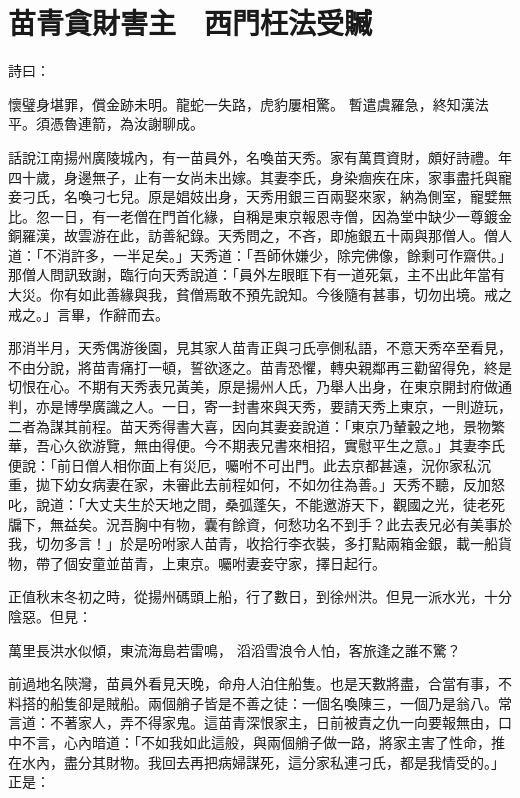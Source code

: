 %

\chapter{苗青貪財害主　西門枉法受贓}

詩曰：

懷璧身堪罪，償金跡未明。龍蛇一失路，虎豹屢相驚。
暫遣虞羅急，終知漢法平。須憑魯連箭，為汝謝聊成。

話說江南揚州廣陵城內，有一苗員外，名喚苗天秀。家有萬貫資財，頗好詩禮。年四十歲，身邊無子，止有一女尚未出嫁。其妻李氏，身染痼疾在床，家事盡托與寵妾刁氏，名喚刁七兒。原是娼妓出身，天秀用銀三百兩娶來家，納為側室，寵嬖無比。忽一日，有一老僧在門首化緣，自稱是東京報恩寺僧，因為堂中缺少一尊鍍金銅羅漢，故雲游在此，訪善紀錄。天秀問之，不吝，即施銀五十兩與那僧人。僧人道：「不消許多，一半足矣。」天秀道：「吾師休嫌少，除完佛像，餘剩可作齋供。」那僧人問訊致謝，臨行向天秀說道：「員外左眼眶下有一道死氣，主不出此年當有大災。你有如此善緣與我，貧僧焉敢不預先說知。今後隨有甚事，切勿出境。戒之戒之。」言畢，作辭而去。

那消半月，天秀偶游後園，見其家人苗青正與刁氏亭側私語，不意天秀卒至看見，不由分說，將苗青痛打一頓，誓欲逐之。苗青恐懼，轉央親鄰再三勸留得免，終是切恨在心。不期有天秀表兄黃美，原是揚州人氏，乃舉人出身，在東京開封府做通判，亦是博學廣識之人。一日，寄一封書來與天秀，要請天秀上東京，一則遊玩，二者為謀其前程。苗天秀得書大喜，因向其妻妾說道：「東京乃輦轂之地，景物繁華，吾心久欲游覽，無由得便。今不期表兄書來相招，實慰平生之意。」其妻李氏便說：「前日僧人相你面上有災厄，囑咐不可出門。此去京都甚遠，況你家私沉重，拋下幼女病妻在家，未審此去前程如何，不如勿往為善。」天秀不聽，反加怒叱，說道：「大丈夫生於天地之間，桑弧蓬矢，不能邀游天下，觀國之光，徒老死牖下，無益矣。況吾胸中有物，囊有餘資，何愁功名不到手？此去表兄必有美事於我，切勿多言！」於是吩咐家人苗青，收拾行李衣裝，多打點兩箱金銀，載一船貨物，帶了個安童並苗青，上東京。囑咐妻妾守家，擇日起行。

正值秋末冬初之時，從揚州碼頭上船，行了數日，到徐州洪。但見一派水光，十分陰惡。但見：

萬里長洪水似傾，東流海島若雷鳴，
滔滔雪浪令人怕，客旅逢之誰不驚？

前過地名陝灣，苗員外看見天晚，命舟人泊住船隻。也是天數將盡，合當有事，不料搭的船隻卻是賊船。兩個艄子皆是不善之徒：一個名喚陳三，一個乃是翁八。常言道：不著家人，弄不得家鬼。這苗青深恨家主，日前被責之仇一向要報無由，口中不言，心內暗道：「不如我如此這般，與兩個艄子做一路，將家主害了性命，推在水內，盡分其財物。我回去再把病婦謀死，這分家私連刁氏，都是我情受的。」正是：

